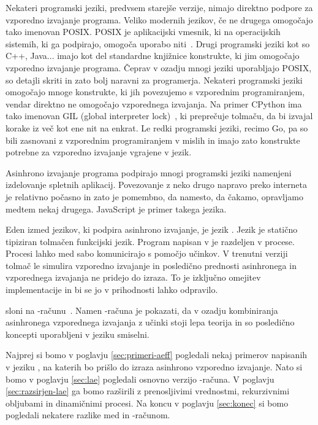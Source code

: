 


Nekateri programski jeziki, predvsem starejše verzije, nimajo direktno podpore za vzporedno izvajanje programa. 
Veliko modernih jezikov, če ne drugega omogočajo tako imenovan POSIX. POSIX je aplikacijski vmesnik, ki na operacijskih sistemih, ki ga podpirajo, omogoča uporabo niti~\cite{posix}.
Drugi programski jeziki kot so C++, Java... imajo kot del standardne knjižnice konstrukte, ki jim omogočajo vzporedno izvajanje programa. Čeprav v ozadju mnogi jeziki uporabljajo POSIX, so detajli skriti in zato bolj naravni za programerja. 
Nekateri programski jeziki omogočajo mnoge konstrukte, ki jih povezujemo s vzporednim programiranjem, vendar direktno ne omogočajo vzporednega izvajanja. Na primer CPython ima tako imenovan GIL (global  interpreter lock)~\cite{gil}, ki preprečuje tolmaču, da bi izvajal korake iz več kot ene nit na enkrat.
Le redki programski jeziki, recimo Go, pa so bili zasnovani z vzporednim programiranjem v mislih in imajo zato konstrukte potrebne za vzporedno izvajanje vgrajene v jezik.

Asinhrono izvajanje programa podpirajo mnogi programski jeziki namenjeni izdelovanje spletnih aplikacij. Povezovanje z neko drugo napravo preko interneta je relativno počasno in zato je pomembno, da namesto, da čakamo, opravljamo medtem nekaj drugega. JavaScript je primer takega jezika. 



Eden izmed jezikov, ki podpira asinhrono izvajanje, je jezik \aeff{}. Jezik \aeff{} je statično tipiziran tolmačen funkcijski jezik. Program napisan v \aeff{} je razdeljen v procese. Procesi lahko med sabo komunicirajo s pomočjo učinkov. V trenutni verziji tolmač le simulira vzporedno izvajanje in posledično prednosti asinhronega in vzporednega izvajanja ne pridejo do izraza. To je izključno omejitev implementacije in bi se jo v prihodnosti lahko odpravilo.

\aeff{} sloni na \lae{}-računu~\cite{aeff}. Namen \lae{}-računa je pokazati, da v ozadju kombiniranja asinhronega vzporednega izvajanja z učinki stoji lepa teorija in so posledično koncepti uporabljeni v jeziku \aeff{} smiselni.


Najprej si bomo v poglavju \ref{sec:primeri-aeff} pogledali nekaj primerov napisanih v jeziku \aeff{}, na katerih bo prišlo do izraza asinhrono vzporedno izvajanje.
Nato si bomo v poglavju \ref{sec:lae} pogledali osnovno verzijo \lae{}-računa. V poglavju \ref{sec:razsirjen-lae} ga bomo razširili z prenosljivimi vrednostmi, rekurzivnimi obljubami in dinamičnimi procesi. Na koncu v poglavju \ref{sec:konec} si bomo pogledali nekatere razlike med \aeff{} in \lae{}-računom.